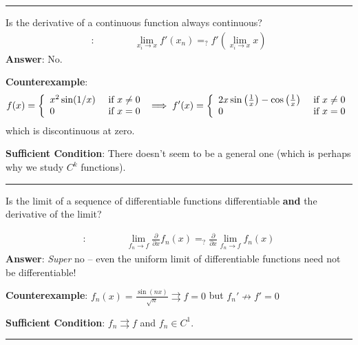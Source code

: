 \begin{center}\rule{0.5\linewidth}{0.5pt}\end{center}

Is the derivative of a continuous function always continuous?
\begin{align*}
[\frac{\partial}{\partial x}, \lim_{x_i\to x}]:\qquad\qquad
\lim_{x_i \to x} f'(x_n) =_? f'(\lim_{x_i\to x} x)
\end{align*} \textbf{Answer}: No.

\textbf{Counterexample}:
\begin{align*}
f ( x ) = \left\{ \begin{array} { l l } { x ^ { 2 } \sin ( 1 / x ) } & { \text { if } x \neq 0 } \\ { 0 } & { \text { if } x = 0 } \end{array} \right.
\implies f ^ { \prime } ( x ) = \left\{ \begin{array} { l l } { 2 x \sin \left( \frac { 1 } { x } \right) - \cos \left( \frac { 1 } { x } \right) } & { \text { if } x \neq 0 } \\ { 0 } & { \text { if } x = 0 } \end{array} \right.
\end{align*} which is discontinuous at zero.

\textbf{Sufficient Condition}: There doesn't seem to be a general one
(which is perhaps why we study \(C^k\) functions).

\begin{center}\rule{0.5\linewidth}{0.5pt}\end{center}

Is the limit of a sequence of differentiable functions differentiable
\textbf{and} the derivative of the limit?

\begin{align*}
[\frac{\partial}{\partial x}, \lim_{f_n \to f}]:\qquad\qquad \lim_{f_n \to f}\frac{\partial}{\partial x}f_n(x) =_? \frac{\partial }{\partial x}\lim_{f_n \to f} f_n(x)
\end{align*} \textbf{Answer}: \emph{Super} no -- even the uniform limit
of differentiable functions need not be differentiable!

\textbf{Counterexample}:
\(f_n(x) = \frac{\sin(nx)}{\sqrt{n}} \rightrightarrows f = 0\) but
\(f_n' \not\to f' = 0\)

\textbf{Sufficient Condition}: \(f_n \rightrightarrows f\) and
\(f_n \in C^1\).

\begin{center}\rule{0.5\linewidth}{0.5pt}\end{center}

